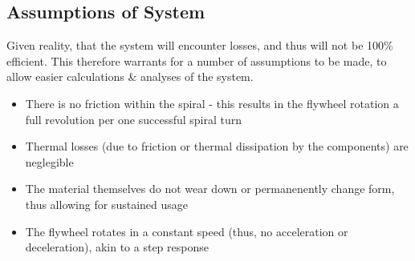 \documentclass[conference]{IEEEtran}
\begin{document}


\subsection{Assumptions of System}
Given reality, that the system will encounter losses, and thus will not be 100\% efficient. This therefore warrants for a number of assumptions to be made, to allow easier calculations \& analyses of the system.
\begin{itemize}
    \item There is no friction within the spiral - this results in the flywheel rotation a full revolution per one successful spiral turn
    \item Thermal losses (due to friction or thermal dissipation by the components) are neglegible
    \item The material themselves do not wear down or permanenently change form, thus allowing for sustained usage
    \item The flywheel rotates in a constant speed (thus, no acceleration or deceleration), akin to a step response
\end{itemize}
\end{document}
